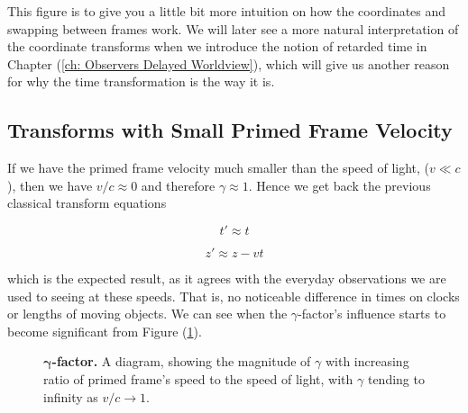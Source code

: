This figure is to give you a little bit more intuition on how the coordinates and swapping between frames work.
We will later see a more natural interpretation of the coordinate transforms when we introduce the notion of retarded time in Chapter (\ref{ch: Observers Delayed Worldview}), which will give us another reason for why the time transformation is the way it is.

\subsection{Transforms with Small Primed Frame Velocity} \label{subsect: Transforms with Slow Primed Frame Velocity}

If we have the primed frame velocity much smaller than the speed of light, ($v \ll c$), then we have ${v}/{c}\approx 0$ and therefore $\gamma \approx 1$.
Hence we get back the previous classical transform equations

\begin{equation}
	{t{'}} \approx t
\end{equation}

\begin{equation}
	z{'} \approx {z}-{v}{t}
\end{equation}

which is the expected result, as it agrees with the everyday observations we are used to seeing at these speeds.
That is, no noticeable difference in times on clocks or lengths of moving objects.
We can see when the $\gamma$-factor's influence starts to become significant from Figure (\ref{fig: Gamma Factor}).

\begin{figure}[H]
	\centering
	\caption{$\boldsymbol{\gamma}$\textbf{-factor.} A diagram, showing the magnitude of $\gamma$ with increasing ratio of primed frame's speed to the speed of light, with ${\gamma}$ tending to infinity as ${v}/{c}\rightarrow 1$.}
	\label{fig: Gamma Factor}
\end{figure}

